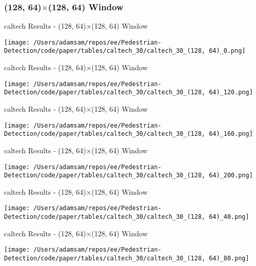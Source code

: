 \subsubsection*{(128, 64)$\times$(128, 64) Window}

\begin{table}
    \caption{caltech Results - (128, 64)$\times$(128, 64) Window}
    \texttt{[image: /Users/adamsam/repos/ee/Pedestrian-Detection/code/paper/tables/caltech\_30/caltech\_30\_(128, 64)\_0.png]}
    \label{tab:caltech_30_(128, 64)_0}
\end{table}

\begin{table}
    \caption{caltech Results - (128, 64)$\times$(128, 64) Window}
    \texttt{[image: /Users/adamsam/repos/ee/Pedestrian-Detection/code/paper/tables/caltech\_30/caltech\_30\_(128, 64)\_120.png]}
    \label{tab:caltech_30_(128, 64)_120}
\end{table}

\begin{table}
    \caption{caltech Results - (128, 64)$\times$(128, 64) Window}
    \texttt{[image: /Users/adamsam/repos/ee/Pedestrian-Detection/code/paper/tables/caltech\_30/caltech\_30\_(128, 64)\_160.png]}
    \label{tab:caltech_30_(128, 64)_160}
\end{table}

\begin{table}
    \caption{caltech Results - (128, 64)$\times$(128, 64) Window}
    \texttt{[image: /Users/adamsam/repos/ee/Pedestrian-Detection/code/paper/tables/caltech\_30/caltech\_30\_(128, 64)\_200.png]}
    \label{tab:caltech_30_(128, 64)_200}
\end{table}

\begin{table}
    \caption{caltech Results - (128, 64)$\times$(128, 64) Window}
    \texttt{[image: /Users/adamsam/repos/ee/Pedestrian-Detection/code/paper/tables/caltech\_30/caltech\_30\_(128, 64)\_40.png]}
    \label{tab:caltech_30_(128, 64)_40}
\end{table}

\begin{table}
    \caption{caltech Results - (128, 64)$\times$(128, 64) Window}
    \texttt{[image: /Users/adamsam/repos/ee/Pedestrian-Detection/code/paper/tables/caltech\_30/caltech\_30\_(128, 64)\_80.png]}
    \label{tab:caltech_30_(128, 64)_80}
\end{table}

